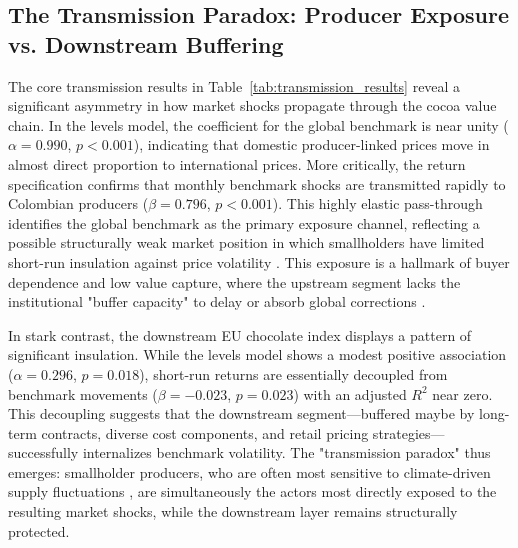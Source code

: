 \documentclass[11pt]{article}
\begin{document}
\subsection{The Transmission Paradox: Producer Exposure vs. Downstream Buffering}

The core transmission results in Table~\ref{tab:transmission_results} reveal a significant asymmetry in how market shocks propagate through the cocoa value chain. In the levels model, the coefficient for the global benchmark is near unity ($\alpha=0.990$, $p<0.001$), indicating that domestic producer-linked prices move in almost direct proportion to international prices. More critically, the return specification confirms that monthly benchmark shocks are transmitted rapidly to Colombian producers ($\beta=0.796$, $p<0.001$). This highly elastic pass-through identifies the global benchmark as the primary exposure channel, reflecting a possible structurally weak market position in which smallholders have limited short-run insulation against price volatility \citep{TsowouGayi2019}. This exposure is a hallmark of buyer dependence and low value capture, where the upstream segment lacks the institutional "buffer capacity" to delay or absorb global corrections \citep{Mithofer2017}.

In stark contrast, the downstream EU chocolate index displays a pattern of significant insulation. While the levels model shows a modest positive association ($\alpha=0.296$, $p=0.018$), short-run returns are essentially decoupled from benchmark movements ($\beta=-0.023$, $p=0.023$) with an adjusted $R^2$ near zero. This decoupling suggests that the downstream segment—buffered maybe by long-term contracts, diverse cost components, and retail pricing strategies—successfully internalizes benchmark volatility. The "transmission paradox" thus emerges: smallholder producers, who are often most sensitive to climate-driven supply fluctuations \citep{Vaast2014}, are simultaneously the actors most directly exposed to the resulting market shocks, while the downstream layer remains structurally protected.
\end{document}
